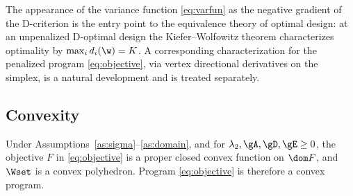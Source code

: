 \begin{remark}
The appearance of the variance function \eqref{eq:varfun} as the negative
gradient of the D-criterion is the entry point to the equivalence theory of
optimal design: at an unpenalized D-optimal design the Kiefer--Wolfowitz theorem
\cite{kiefer1960} characterizes optimality by $\max_i d_i(\w)=K$. A
corresponding characterization for the penalized program \eqref{eq:objective},
via vertex directional derivatives on the simplex, is a natural development and
is treated separately.
\end{remark}

\subsection{Convexity}

\begin{proposition}[Convexity]
\label{prop:convex}
Under Assumptions~\ref{as:sigma}--\ref{as:domain}, and for
$\lambda_2,\gA,\gD,\gE\ge0$, the objective $F$ in \eqref{eq:objective} is a
proper closed convex function on $\dom F$, and $\Wset$ is a convex polyhedron.
Program \eqref{eq:objective} is therefore a convex program.
\end{proposition}


